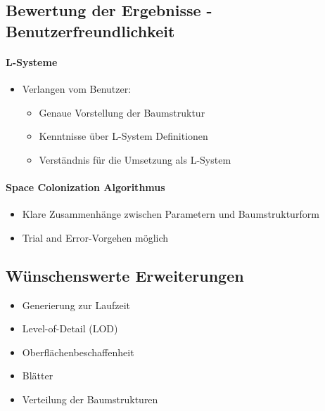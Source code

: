 \newpage
\subsection{Bewertung der Ergebnisse - Benutzerfreundlichkeit\\}

\paragraph{L-Systeme}
\begin{itemize}
	\item Verlangen vom Benutzer:
	\begin{itemize}
		\item Genaue Vorstellung der Baumstruktur
		\item Kenntnisse über L-System Definitionen
		\item Verständnis für die Umsetzung als L-System
	\end{itemize}
\end{itemize}


\paragraph{Space Colonization Algorithmus}
\begin{itemize}
	\item Klare Zusammenhänge zwischen Parametern und Baumstrukturform
	
	\item \glqq Trial and Error\grqq-Vorgehen möglich
\end{itemize}




\newpage
{}
\subsection{Wünschenswerte Erweiterungen\\}

\begin{itemize}
	\item Generierung zur Laufzeit\\
	
	\item Level-of-Detail (LOD)\\
	
	\item Oberflächenbeschaffenheit\\
	
	\item Blätter\\
	
	\item Verteilung der Baumstrukturen
\end{itemize}


